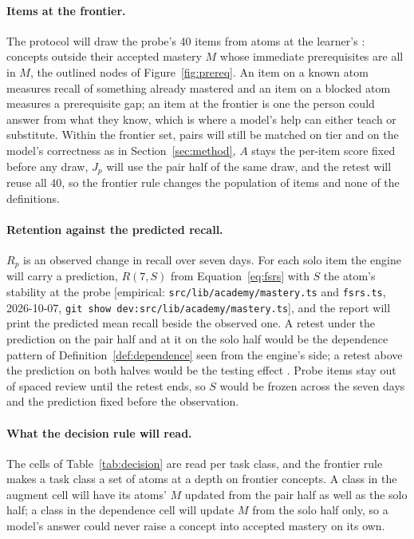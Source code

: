 \documentclass[11pt]{article}
\newcommand{\emp}[1]{\textcolor{bucketgray}{\footnotesize [empirical: #1]}}
\newcommand{\mast}{\emp{\texttt{src/\allowbreak lib/\allowbreak academy/\allowbreak mastery.\allowbreak ts} and \texttt{fsrs.\allowbreak ts}, 2026-10-07, \texttt{git show dev:src/\allowbreak lib/\allowbreak academy/\allowbreak mastery.\allowbreak ts}}}
\begin{document}
\paragraph{Items at the frontier.}
The protocol will draw the probe's 40 items from atoms at the learner's : concepts outside their accepted mastery $M$ whose immediate prerequisites are all in $M$, the outlined nodes of Figure~\ref{fig:prereq}. An item on a known atom measures recall of something already mastered and an item on a blocked atom measures a prerequisite gap; an item at the frontier is one the person could answer from what they know, which is where a model's help can either teach or substitute. Within the frontier set, pairs will still be matched on tier and on the model's correctness as in Section~\ref{sec:method}, $A$ stays the per-item score fixed before any draw, $J_p$ will use the pair half of the same draw, and the retest will reuse all 40, so the frontier rule changes the population of items and none of the definitions.

\paragraph{Retention against the predicted recall.}
$R_p$ is an observed change in recall over seven days. For each solo item the engine will carry a prediction, $R(7, S)$ from Equation~\eqref{eq:fsrs} with $S$ the atom's stability at the probe \mast, and the report will print the predicted mean recall beside the observed one. A retest under the prediction on the pair half and at it on the solo half would be the dependence pattern of Definition~\ref{def:dependence} seen from the engine's side; a retest above the prediction on both halves would be the testing effect \autocite{roediger2006testing}. Probe items stay out of spaced review until the retest ends, so $S$ would be frozen across the seven days and the prediction fixed before the observation.

\paragraph{What the decision rule will read.}
The cells of Table~\ref{tab:decision} are read per task class, and the frontier rule makes a task class a set of atoms at a depth on frontier concepts. A class in the augment cell will have its atoms' $M$ updated from the pair half as well as the solo half; a class in the dependence cell will update $M$ from the solo half only, so a model's answer could never raise a concept into accepted mastery on its own.
\end{document}
